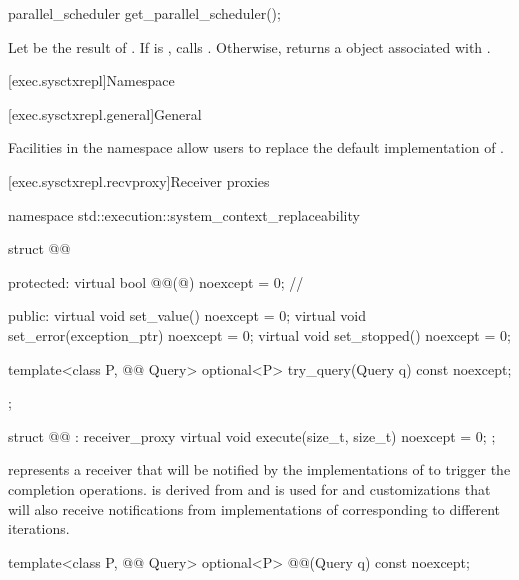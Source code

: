 %
\begin{itemdecl}
parallel_scheduler get_parallel_scheduler();
\end{itemdecl}

\begin{itemdescr}
\pnum
\effects
Let  be the result of .
If  is ,
calls .
Otherwise, returns a  object
associated with .
\end{itemdescr}

[exec.sysctxrepl]{Namespace }

[exec.sysctxrepl.general]{General}

\pnum
Facilities in the  namespace
allow users to replace the default implementation of .

[exec.sysctxrepl.recvproxy]{Receiver proxies}

\begin{codeblock}
namespace std::execution::system_context_replaceability {
  struct @@ {
  protected:
    virtual bool @@(@\unspecnc@) noexcept = 0;   // \expos

  public:
    virtual void set_value() noexcept = 0;
    virtual void set_error(exception_ptr) noexcept = 0;
    virtual void set_stopped() noexcept = 0;

    template<class P, @@ Query>
      optional<P> try_query(Query q) const noexcept;
  };

  struct @@ : receiver_proxy {
    virtual void execute(size_t, size_t) noexcept = 0;
  };
}
\end{codeblock}

\pnum
{} represents a receiver
that will be notified
by the implementations of 
to trigger the completion operations.
 is derived from  and
is used for  and  customizations
that will also receive notifications
from implementations of 
corresponding to different iterations.

\begin{itemdecl}
template<class P, @@ Query>
  optional<P> @@(Query q) const noexcept;
\end{itemdecl}

